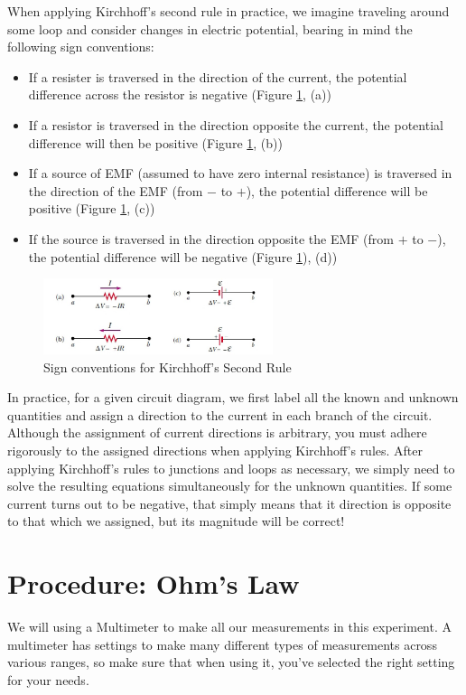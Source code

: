 When applying Kirchhoff's second rule in practice, we imagine traveling around some loop and consider changes in electric potential, bearing in mind the following sign conventions:\myskip
\begin{itemize}
	\item If a resister is traversed in the direction of the current, the potential difference across the resistor is negative (Figure \ref{fig:signconventions}, (a))
	\item If a resistor is traversed in the direction opposite the current, the potential difference will then be positive (Figure \ref{fig:signconventions}, (b))
	\item If a source of EMF (assumed to have zero internal resistance) is traversed in the direction of the EMF (from $-$ to $+$), the potential difference will be positive (Figure \ref{fig:signconventions}, (c))
	\item If the source is traversed in the direction opposite the EMF (from $+$ to $-$), the potential difference will be negative (Figure \ref{fig:signconventions}), (d))
\end{itemize}

\begin{figure}[h]
\centering
\includegraphics[width=0.6\textwidth]{./Exp2/pic/signconventions.jpg}
\caption{Sign conventions for Kirchhoff's Second Rule}
\label{fig:signconventions}
\end{figure}

In practice, for a given circuit diagram, we first label all the known and unknown quantities and assign a direction to the current in each branch of the circuit. Although the assignment of current directions is arbitrary, you must adhere rigorously to the assigned directions when applying Kirchhoff's rules. After applying Kirchhoff's rules to junctions and loops as necessary, we simply need to solve the resulting equations simultaneously for the unknown quantities. If some current turns out to be negative, that simply means that it direction is opposite to that which we assigned, but its magnitude will be correct!

\section{Procedure: Ohm's Law}
\label{sec:ohmslaw}
We will using a Multimeter to make all our measurements in this experiment. A multimeter has settings to make many different types of measurements across various ranges, so make sure that when using it, you've selected the right setting for your needs.\myskip


